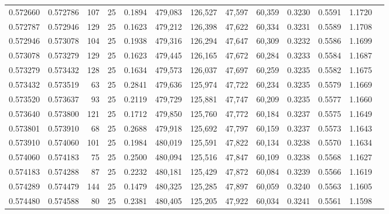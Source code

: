 \begin{tabular}{rrrrrrrrrrrrr}
0.572660 & 0.572786 &   107 &  25 &                                     0.1894 & 479,083 & 126,527 &  47,597 &  60,359 & 0.3230 & 0.5591 & 1.1720 \\
0.572787 & 0.572946 &   129 &  25 &                                     0.1623 & 479,212 & 126,398 &  47,622 &  60,334 & 0.3231 & 0.5589 & 1.1708 \\
0.572946 & 0.573078 &   104 &  25 &                                     0.1938 & 479,316 & 126,294 &  47,647 &  60,309 & 0.3232 & 0.5586 & 1.1699 \\
0.573078 & 0.573279 &   129 &  25 &                                     0.1623 & 479,445 & 126,165 &  47,672 &  60,284 & 0.3233 & 0.5584 & 1.1687 \\
0.573279 & 0.573432 &   128 &  25 &                                     0.1634 & 479,573 & 126,037 &  47,697 &  60,259 & 0.3235 & 0.5582 & 1.1675 \\
0.573432 & 0.573519 &    63 &  25 &                                     0.2841 & 479,636 & 125,974 &  47,722 &  60,234 & 0.3235 & 0.5579 & 1.1669 \\
0.573520 & 0.573637 &    93 &  25 &                                     0.2119 & 479,729 & 125,881 &  47,747 &  60,209 & 0.3235 & 0.5577 & 1.1660 \\
0.573640 & 0.573800 &   121 &  25 &                                     0.1712 & 479,850 & 125,760 &  47,772 &  60,184 & 0.3237 & 0.5575 & 1.1649 \\
0.573801 & 0.573910 &    68 &  25 &                                     0.2688 & 479,918 & 125,692 &  47,797 &  60,159 & 0.3237 & 0.5573 & 1.1643 \\
0.573910 & 0.574060 &   101 &  25 &                                     0.1984 & 480,019 & 125,591 &  47,822 &  60,134 & 0.3238 & 0.5570 & 1.1634 \\
0.574060 & 0.574183 &    75 &  25 &                                     0.2500 & 480,094 & 125,516 &  47,847 &  60,109 & 0.3238 & 0.5568 & 1.1627 \\
0.574183 & 0.574288 &    87 &  25 &                                     0.2232 & 480,181 & 125,429 &  47,872 &  60,084 & 0.3239 & 0.5566 & 1.1619 \\
0.574289 & 0.574479 &   144 &  25 &                                     0.1479 & 480,325 & 125,285 &  47,897 &  60,059 & 0.3240 & 0.5563 & 1.1605 \\
0.574480 & 0.574588 &    80 &  25 &                                     0.2381 & 480,405 & 125,205 &  47,922 &  60,034 & 0.3241 & 0.5561 & 1.1598 \\

\end{tabular}
